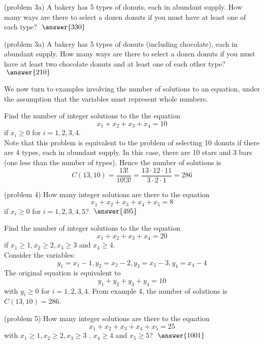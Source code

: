 \documentclass[handout]{ximera}
\begin{document}
\begin{problem}(problem 3a)
A bakery has 5 types of donuts, each in abundant supply. How many ways are there to select a dozen donuts if you must have at least one of each type? $\; \answer{330}$
\end{problem}

\begin{problem}(problem 3a)
A bakery has 5 types of donuts (including chocolate), each in abundant supply. How many ways are there to select a dozen donuts if you must have at least two chocolate donuts and at least one of each other type? $\; \answer{210}$
\end{problem}

We now turn to examples involving the number of solutions to an equation, under the assumption that 
the variables must represent whole numbers.

\begin{example}[example 4]
Find the number of integer solutions to the the equation
\[
x_1 + x_2 + x_3 + x_4 = 10
\]
if $x_i \geq 0$ for $i = 1, 2, 3, 4$.\\
Note that this problem is equivalent to the problem of selecting 10 donuts if there are 4 types, each in abundant supply. In this case, there are 10 stars and 3 bars (one less than the number of types).  Hence the number of solutions is 
\[
C(13, 10) = \frac{13!}{10! 3!} = \frac{13 \cdot 12 \cdot 11}{3 \cdot 2 \cdot 1} = 286
\]
\end{example}

\begin{problem}(problem 4)
How many integer solutions are there to the equation
\[
x_1 + x_2 + x_3 + x_4 +x_5 = 8
\]
if $x_i \geq 0$  for $i = 1, 2, 3, 4, 5$? $\; \answer{495}$
\end{problem}


\begin{example}[example 5]
Find the number of integer solutions to the the equation
\[
x_1 + x_2 + x_3 + x_4 = 20
\]
if $x_1 \geq 1, x_2 \geq 2, x_3 \geq 3$ and $x_4 \geq 4$.\\
Consider the variables:
\[
y_1 = x_1 -1, y_2 = x_2 -2, y_3 = x_3 -3, y_4 = x_4 -4
\]
The original equation is equivalent to
\[
y_1 + y_2 + y_3 + y_4 = 10
\]
with $y_i \geq 0$ for $i = 1, 2, 3, 4$. From example 4, the number of solutions is $C(13,10) = 286$.
\end{example}


\begin{problem}(problem 5)
How many integer solutions are there to the equation
\[
x_1 + x_2 + x_3 + x_4 +x_5 = 25
\]
with $x_1 \geq 1, x_2 \geq 2, x_3 \geq 3$ , $x_4 \geq 4$ and $x_5 \geq 5$? $\; \answer{1001}$

\end{problem}
\end{document}
